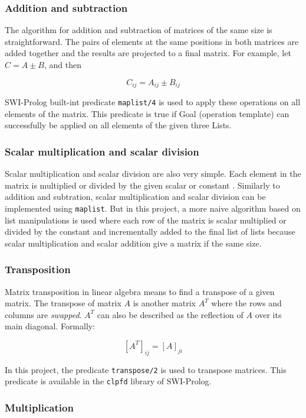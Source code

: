 \documentclass[a4paper]{article}
\begin{document}
\subsubsection{Addition and subtraction}

The algorithm for addition and subtraction of matrices of the same size is straightforward. The pairs of elements at the same positions in both matrices are added together and the results are projected to a final matrix. For example, let $C = A \pm B$, and then

\[C_{ij} = A_{ij} \pm B_{ij}\]

SWI-Prolog built-int predicate \texttt{maplist/4} \cite{maplist} is used to apply these operations on all elements of the matrix. This predicate is true if Goal (operation template) can successfully be applied on all elements of the given three Lists.

\subsubsection{Scalar multiplication and scalar division}

Scalar multiplication and scalar division are also very simple. Each element in the matrix is multiplied or divided by the given scalar or constant \cite{stapel1}. Similarly to addition and subtration, scalar multiplication and scalar division can be implemented using \texttt{maplist}. But in this project, a more naive algorithm based on list manipulations is used where each row of the matrix is scalar multiplied or divided by the constant and incrementally added to the final list of lists because scalar multiplication and scalar addition give a matrix if the same size.


\subsubsection{Transposition}

Matrix transposition in linear algebra means to find a transpose of a given matrix. The transpose of matrix $A$ is another matrix $A^T$ where the rows and columns are \textit{swapped}. $A^T$ can also be described as the reflection of $A$ over its main diagonal. Formally:

\[[A^T]_{ij} = [A]_{ji}\]

In this project, the predicate \texttt{transpose/2} is used to transpose matrices. This predicate is available in the \texttt{clpfd} library of SWI-Prolog.


\subsubsection{Multiplication}
\end{document}
